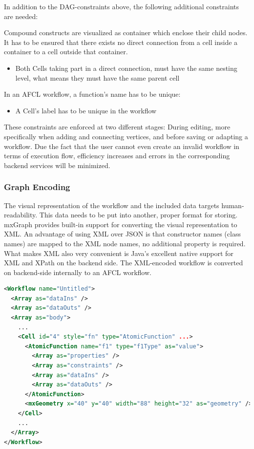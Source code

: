 \documentclass[a4paper,top=25mm,bottom=25mm,12pt,pdftex,halfparskip,twoside,bibtotoc,numbers=noenddot]{scrbook}
\begin{document}
In addition to the DAG-constraints above, the following additional constraints are needed:

Compound constructs are visualized as container which enclose their child nodes. It has to be ensured that there exists no direct connection from a cell inside a container to a cell outside that container.
\begin{itemize}
	\item Both \textsf{Cell}s taking part in a direct connection, must have the same nesting level, what means they must have the same parent cell
\end{itemize}
In an AFCL workflow, a function's name has to be unique:
\begin{itemize}
	\item A \textsf{Cell}'s label has to be unique in the workflow
\end{itemize}

These constraints are enforced at two different stages: During editing, more specifically when adding and connecting vertices, and before saving or adapting a workflow.
Due the fact that the user cannot even create an invalid workflow in terms of execution flow, efficiency increases and errors in the corresponding backend services will be minimized.


\subsubsection{Graph Encoding}

The visual representation of the workflow and the included data targets human-readability. This data needs to be put into another, proper format for storing. mxGraph provides built-in support for converting the visual representation to XML. An advantage of using XML over JSON is that constructor names (class names) are mapped to the XML node names, no additional property is required.
What makes XML also very convenient is Java's excellent native support for XML and XPath on the backend side. The XML-encoded workflow is converted on backend-side internally to an AFCL workflow.

\begin{lstlisting}[language=XML,caption={Example of a XML-encoded Workflow.},label={lst:xml-workflow-example}]
<Workflow name="Untitled">
  <Array as="dataIns" />
  <Array as="dataOuts" />
  <Array as="body">
    ...
    <Cell id="4" style="fn" type="AtomicFunction" ...>
      <AtomicFunction name="f1" type="f1Type" as="value">
        <Array as="properties" />
        <Array as="constraints" />
        <Array as="dataIns" />
        <Array as="dataOuts" />
      </AtomicFunction>
      <mxGeometry x="40" y="40" width="88" height="32" as="geometry" />
    </Cell>
    ...
  </Array>
</Workflow>
\end{lstlisting}
\end{document}
